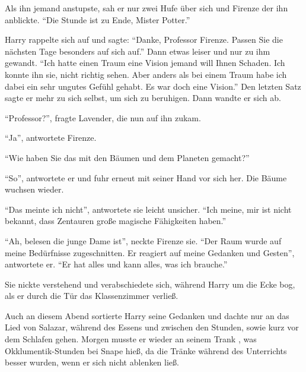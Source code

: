 Als ihn jemand anstupste, sah er nur zwei Hufe über sich und Firenze der ihn anblickte. \enquote{Die Stunde ist zu Ende, Mister Potter.}

Harry rappelte sich auf und sagte: \enquote{Danke, Professor Firenze. Passen Sie die nächsten Tage besonders auf sich auf.} Dann etwas leiser und nur zu ihm gewandt. \enquote{Ich hatte einen Traum \gst eine Vision \gst jemand will Ihnen Schaden. Ich konnte ihn \gst sie, nicht richtig sehen. Aber anders als bei einem Traum habe ich dabei ein sehr ungutes Gefühl gehabt. Es war doch eine Vision.} Den letzten Satz sagte er mehr zu sich selbst, um sich zu beruhigen. Dann wandte er sich ab.

\enquote{Professor?}, fragte Lavender, die nun auf ihn zukam.

\enquote{Ja}, antwortete Firenze.

\enquote{Wie haben Sie das mit den Bäumen und dem Planeten gemacht?}

\enquote{So}, antwortete er und fuhr erneut mit seiner Hand vor sich her. Die Bäume wuchsen wieder.

\enquote{Das meinte ich nicht}, antwortete sie leicht unsicher. \enquote{Ich meine, mir ist nicht bekannt, dass Zentauren große magische Fähigkeiten haben.}

\enquote{Ah, belesen die junge Dame ist}, neckte Firenze sie. \enquote{Der Raum wurde auf meine Bedürfnisse zugeschnitten. Er reagiert auf meine Gedanken und Gesten}, antwortete er. \enquote{Er hat alles und kann alles, was ich brauche.}

Sie nickte verstehend und verabschiedete sich, während Harry um die Ecke bog, als er durch die Tür das Klassenzimmer verließ.

Auch an diesem Abend sortierte Harry seine Gedanken und dachte nur an das Lied von Salazar, während des Essens und zwischen den Stunden, sowie kurz vor dem Schlafen gehen. Morgen musste er wieder an seinem Trank , was Okklumentik-Stunden bei Snape hieß, da die Tränke während des Unterrichts besser wurden, wenn er sich nicht ablenken ließ.

